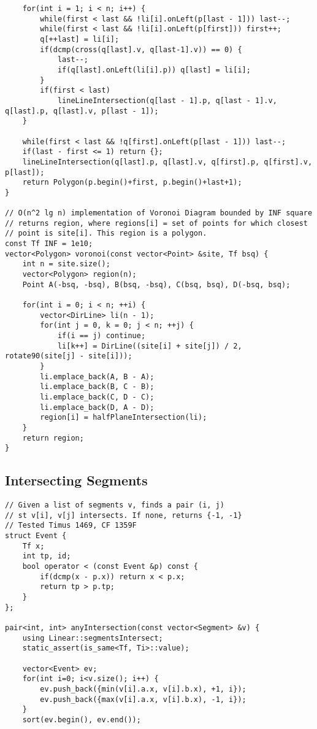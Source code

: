 \documentclass[FSZ,a4paper,onesided]{article}
\begin{document}
\begin{multicols*}{\COLS}
\begin{lstlisting}
    for(int i = 1; i < n; i++) {
        while(first < last && !li[i].onLeft(p[last - 1])) last--;
        while(first < last && !li[i].onLeft(p[first])) first++;
        q[++last] = li[i];
        if(dcmp(cross(q[last].v, q[last-1].v)) == 0) {
            last--;
            if(q[last].onLeft(li[i].p)) q[last] = li[i];
        }
        if(first < last)
            lineLineIntersection(q[last - 1].p, q[last - 1].v, q[last].p, q[last].v, p[last - 1]);
    }

    while(first < last && !q[first].onLeft(p[last - 1])) last--;
    if(last - first <= 1) return {};
    lineLineIntersection(q[last].p, q[last].v, q[first].p, q[first].v, p[last]);
    return Polygon(p.begin()+first, p.begin()+last+1);
}

// O(n^2 lg n) implementation of Voronoi Diagram bounded by INF square
// returns region, where regions[i] = set of points for which closest
// point is site[i]. This region is a polygon.
const Tf INF = 1e10;
vector<Polygon> voronoi(const vector<Point> &site, Tf bsq) {
    int n = site.size();
    vector<Polygon> region(n);
    Point A(-bsq, -bsq), B(bsq, -bsq), C(bsq, bsq), D(-bsq, bsq);

    for(int i = 0; i < n; ++i) {
        vector<DirLine> li(n - 1);
        for(int j = 0, k = 0; j < n; ++j) {
            if(i == j) continue;
            li[k++] = DirLine((site[i] + site[j]) / 2, rotate90(site[j] - site[i]));
        }
        li.emplace_back(A, B - A);
        li.emplace_back(B, C - B);
        li.emplace_back(C, D - C);
        li.emplace_back(D, A - D);
        region[i] = halfPlaneIntersection(li);
    }
    return region;
}\end{lstlisting}
\subsection{Intersecting Segments}
\begin{lstlisting}
// Given a list of segments v, finds a pair (i, j)
// st v[i], v[j] intersects. If none, returns {-1, -1}
// Tested Timus 1469, CF 1359F
struct Event {
    Tf x;
    int tp, id;
    bool operator < (const Event &p) const {
        if(dcmp(x - p.x)) return x < p.x;
        return tp > p.tp;
    }
};

pair<int, int> anyIntersection(const vector<Segment> &v) {
    using Linear::segmentsIntersect;
    static_assert(is_same<Tf, Ti>::value);

    vector<Event> ev;
    for(int i=0; i<v.size(); i++) {
        ev.push_back({min(v[i].a.x, v[i].b.x), +1, i});
        ev.push_back({max(v[i].a.x, v[i].b.x), -1, i});
    }
    sort(ev.begin(), ev.end());


\end{lstlisting}
\end{multicols*}
\end{document}
